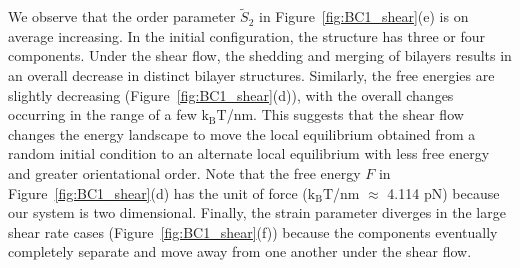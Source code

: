 \documentclass[prb,preprint,showpacs,preprintnumbers,amsmath,amssymb,longbibliography]{revtex4-1}
\begin{document}
We observe that the order parameter $\tilde S_2$ in
Figure~\ref{fig:BC1_shear}(e) is on average increasing. In the initial
configuration, the structure has three or four components.
%
Under the shear flow, the shedding and merging of bilayers results in an
overall decrease in distinct bilayer structures. Similarly, the free
energies are slightly decreasing (Figure~\ref{fig:BC1_shear}(d)), with
the overall changes occurring in the range of a few $\mathrm{k_BT}$/nm.
This suggests that the shear flow changes the energy landscape to move
the local equilibrium obtained from a random initial condition to an
alternate local equilibrium with less free energy and greater
orientational order.  Note that the free energy $F$ in
Figure~\ref{fig:BC1_shear}(d) has the unit of force ($\mathrm{k_BT}$/nm $\approx$ 4.114 pN)
because our system
is two dimensional.
%
%
Finally, the strain parameter diverges in the large shear rate cases
(Figure~\ref{fig:BC1_shear}(f))
because the components eventually completely separate and move away from one another
under the shear flow.
\end{document}
